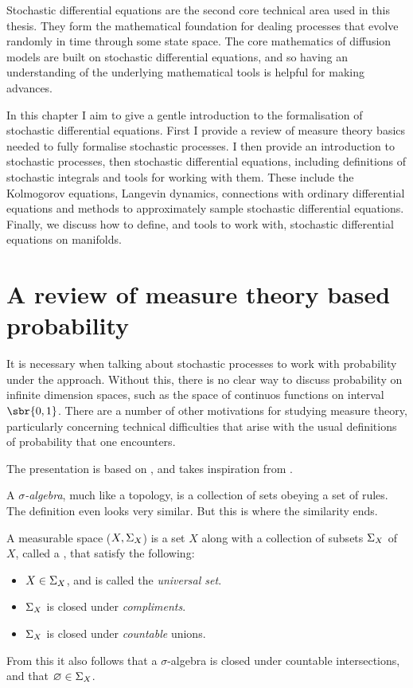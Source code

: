 
Stochastic differential equations are the second core technical area used in this thesis.
They form the mathematical foundation for dealing processes that evolve randomly in time through some state space.
The core mathematics of diffusion models are built on stochastic differential equations, and so having an understanding of the underlying mathematical tools is helpful for making advances.

In this chapter I aim to give a gentle introduction to the formalisation of stochastic differential equations.
First I provide a review of measure theory basics needed to fully formalise stochastic processes.
I then provide an introduction to stochastic processes, then stochastic differential equations, including definitions of stochastic integrals and tools for working with them.
These include the Kolmogorov equations, Langevin dynamics, connections with ordinary differential equations and methods to approximately sample stochastic differential equations.
Finally, we discuss how to define, and tools to work with, stochastic differential equations on manifolds.



\section{A review of measure theory based probability}
\label{sec:measure_theory}
It is necessary when talking about stochastic processes to work with probability under the  approach.
Without this, there is no clear way to discuss probability on infinite dimension spaces, such as the space of continuos functions on interval \(\sbr{0,1}\). 
There are a number of other motivations for studying measure theory, particularly concerning technical difficulties that arise with the usual definitions of probability that one encounters.

The presentation is based on \textcite{kallenberg1997foundations}, and takes inspiration from \textcite{terenin22}.

A \emph{\(\sigma\)-algebra}, much like a topology, is a collection of sets obeying a set of rules.
The definition even looks very similar.
But this is where the similarity ends.
\begin{definition}
	A measurable space (\(X, \Sigma_{X}\)) is a set \(X\) along with a collection of subsets \(\Sigma_{X}\) of \(X\), called a , that satisfy the following:
	\begin{itemize}
		\item \(X \in \Sigma_{X}\), and is called the \emph{universal set}.
		\item \(\Sigma_{X}\) is closed under \emph{compliments}.
		\item \(\Sigma_{X}\) is closed under \emph{countable} unions.
	\end{itemize}
\end{definition}
From this it also follows that a \(\sigma\)-algebra is closed under countable intersections, and that \(\varnothing \in \Sigma_{X}\).

